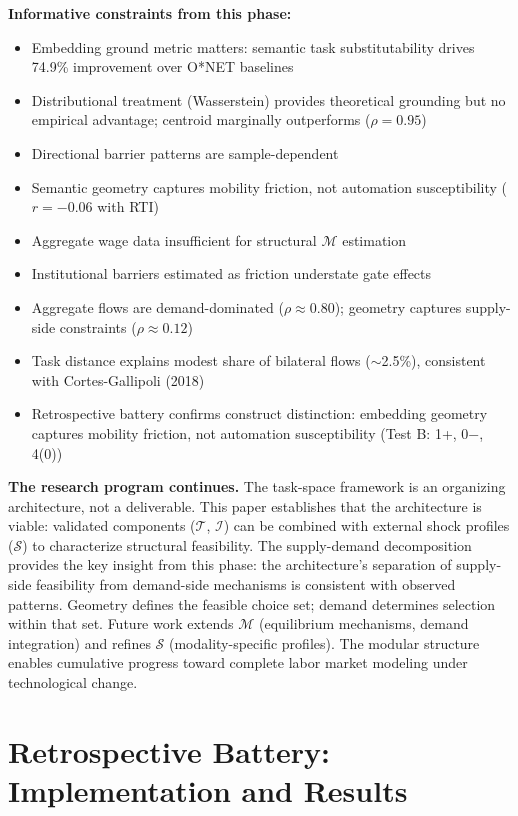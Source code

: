 \documentclass[12pt]{article}
\begin{document}
\textbf{Informative constraints from this phase:}
\begin{itemize}
    \item Embedding ground metric matters: semantic task substitutability drives 74.9\% improvement over O*NET baselines
    \item Distributional treatment (Wasserstein) provides theoretical grounding but no empirical advantage; centroid marginally outperforms ($\rho = 0.95$)
    \item Directional barrier patterns are sample-dependent
    \item Semantic geometry captures mobility friction, not automation susceptibility ($r = -0.06$ with RTI)
    \item Aggregate wage data insufficient for structural $\mathcal{M}$ estimation
    \item Institutional barriers estimated as friction understate gate effects
    \item Aggregate flows are demand-dominated ($\rho \approx 0.80$); geometry captures supply-side constraints ($\rho \approx 0.12$)
    \item Task distance explains modest share of bilateral flows ($\sim$2.5\%), consistent with Cortes-Gallipoli (2018)
    \item Retrospective battery confirms construct distinction: embedding geometry captures mobility friction, not automation susceptibility (Test B: 1+, 0$-$, 4(0))
\end{itemize}


\textbf{The research program continues.} The task-space framework is an organizing architecture, not a deliverable. This paper establishes that the architecture is viable: validated components ($\mathcal{T}$, $\mathcal{I}$) can be combined with external shock profiles ($\mathcal{S}$) to characterize structural feasibility. The supply-demand decomposition provides the key insight from this phase: the architecture's separation of supply-side feasibility from demand-side mechanisms is consistent with observed patterns. Geometry defines the feasible choice set; demand determines selection within that set. Future work extends $\mathcal{M}$ (equilibrium mechanisms, demand integration) and refines $\mathcal{S}$ (modality-specific profiles). The modular structure enables cumulative progress toward complete labor market modeling under technological change.


\appendix


\section{Retrospective Battery: Implementation and Results}
\label{app:retrospective}
\end{document}
